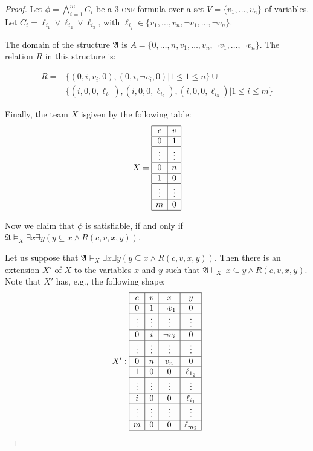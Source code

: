 \documentclass{article}
\theoremstyle{plain}
\theoremstyle{definition}
\newcommand{\mA}{{\mathfrak A}}
\newcommand{\pb}[1]{\textsc{#1}}
\begin{document}
\begin{proof}
	Let $\phi = \bigwedge_{i=1}^mC_i$ be a $3$-\pb{cnf} formula over a set $V = \{v_1,\hdots,v_n\}$ of variables. Let $C_i = \ell_{i_1} \vee \ell_{i_2} \vee \ell_{i_3}$, with $\ell_{i_j} \in \{v_1,\hdots,v_n,\neg v_1,\hdots, \neg v_n\}$.
	
	The domain of the structure $\mA$ is $A = \{0,\hdots,n,v_1,\hdots,v_n,\neg v_1,\hdots, \neg v_n\}$. The relation $R$ in this structure is:
	
	\begin{align*}
	R = & \{(0,i,v_i,0), (0,i,\neg v_i,0) | 1 \leq 1 \leq n\} \cup \\
		&\{(i,0,0, \ell_{i_1}),(i,0,0, \ell_{i_2}),(i,0,0, \ell_{i_3}) | 1 \leq i \leq m\}
	\end{align*}
	
	Finally, the team $X$ isgiven by the following table: 
		\[X=
		\begin{array}{|c|c|}
    			\hline  
		c & v  \\ 
			\hline
  		0 & 1   \\ 
			\hline
 		\vdots & \vdots \\ 
			\hline
		0 & n \\
			\hline
		1 & 0 \\  
			\hline
 		\vdots & \vdots  \\ 
			\hline
		m & 0 \\
			\hline
  		\end{array} 
		\]
	
	Now we claim that $\phi$ is satisfiable, if and only if $ \mA \models_X \exists x \exists y (y \subseteq x \wedge R(c,v,x,y))$.
	
Let us suppose that $ \mA \models_X \exists x \exists y (y \subseteq x \wedge R(c,v,x,y))$. Then there is an extension $X'$ of $X$ to the variables $x$ and $y$ such that 
		$ \mA \models_{X'} x \subseteq y \wedge R(c,v,x,y)$. Note that $X'$ 
	 has, e.g.,  the following shape:
		\[X':
		\begin{array}{|c|c|c|c|}
    			\hline  
		c & v & x & y \\ 
			\hline
  		0 & 1 & \neg v_1 & 0  \\ 
			\hline
 		\vdots & \vdots &\vdots & \vdots \\ 
			\hline
  		0 & i & \neg v_i & 0   \\ 
			\hline
 		\vdots & \vdots &\vdots & \vdots \\ 
			\hline
		0 & n  & v_n & 0\\
			\hline
		1 & 0 & 0 & \ell_{1_2} \\  
			\hline
 		\vdots & \vdots &\vdots & \vdots  \\ 
			\hline
		i & 0 & 0 & \ell_{i_1} \\  
			\hline
 		\vdots & \vdots &\vdots & \vdots  \\ 
			\hline
		m & 0 & 0 & \ell_{m_2} \\
			\hline
  		\end{array} 
		\]


\end{proof}
\end{document}
